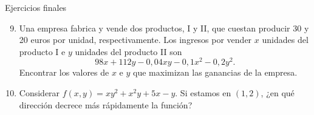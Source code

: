 \documentclass[main.tex]{subfiles}
\begin{document}
\begin{frame}{Ejercicios finales}
\small\begin{enumerate}\setcounter{enumi}{8}
\item Una empresa fabrica y vende dos productos, I y II, que cuestan producir 30 y 20 euros por unidad, respectivamente. Los ingresos por vender $x$ unidades del producto I e $y$ unidades del producto II son
\[98x+112y-0{,}04xy-0{,}1x^2-0{,}2y^2.\]
Encontrar los valores de $x$ e $y$ que maximizan las ganancias de la empresa.
\item Considerar $f(x,y)=xy^2+x^2y+5x-y$. Si estamos en $(1,2)$, ¿en qué dirección decrece más rápidamente la función?
\end{enumerate}
\end{frame}
\end{document}
